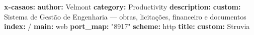 \documentclass[
  10pt,
]{article}
\newenvironment{Shaded}{\begin{snugshade}}{\end{snugshade}}
\newcommand{\AttributeTok}[1]{\textcolor[rgb]{0.13,0.29,0.53}{#1}}
\newcommand{\FunctionTok}[1]{\textcolor[rgb]{0.13,0.29,0.53}{\textbf{#1}}}
\newcommand{\KeywordTok}[1]{\textcolor[rgb]{0.13,0.29,0.53}{\textbf{#1}}}
\newcommand{\StringTok}[1]{\textcolor[rgb]{0.31,0.60,0.02}{#1}}
\begin{document}
\begin{Shaded}
\begin{Highlighting}[]
\FunctionTok{x{-}casaos}\KeywordTok{:}
\AttributeTok{  }\FunctionTok{author}\KeywordTok{:}\AttributeTok{ Velmont}
\AttributeTok{  }\FunctionTok{category}\KeywordTok{:}\AttributeTok{ Productivity}
\AttributeTok{  }\FunctionTok{description}\KeywordTok{:}
\AttributeTok{    }\FunctionTok{custom}\KeywordTok{:}\AttributeTok{ Sistema de Gestão de Engenharia — obras, licitações, financeiro e documentos}
\AttributeTok{  }\FunctionTok{index}\KeywordTok{:}\AttributeTok{ /}
\AttributeTok{  }\FunctionTok{main}\KeywordTok{:}\AttributeTok{ web}
\AttributeTok{  }\FunctionTok{port\_map}\KeywordTok{:}\AttributeTok{ }\StringTok{"8917"}
\AttributeTok{  }\FunctionTok{scheme}\KeywordTok{:}\AttributeTok{ http}
\AttributeTok{  }\FunctionTok{title}\KeywordTok{:}
\AttributeTok{    }\FunctionTok{custom}\KeywordTok{:}\AttributeTok{ Struvia}
\end{Highlighting}
\end{Shaded}
\end{document}
